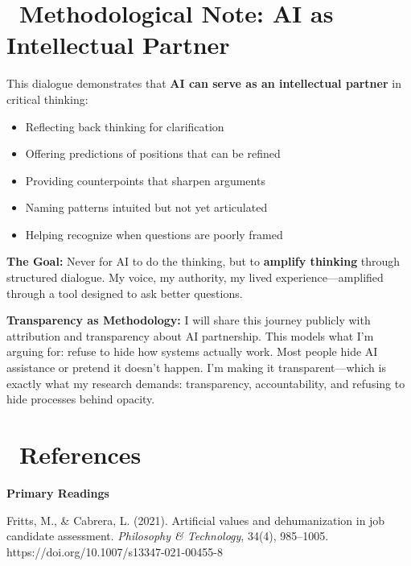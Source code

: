\documentclass[12pt,letterpaper]{article}
\begin{document}
\newpage
\section*{\color{primaryblue}\faUsers\ Methodological Note: AI as Intellectual Partner}

This dialogue demonstrates that \textbf{AI can serve as an intellectual partner} in critical thinking:

\begin{itemize}[leftmargin=*,noitemsep]
    \item Reflecting back thinking for clarification
    \item Offering predictions of positions that can be refined
    \item Providing counterpoints that sharpen arguments
    \item Naming patterns intuited but not yet articulated
    \item Helping recognize when questions are poorly framed
\end{itemize}

\textbf{The Goal:} Never for AI to do the thinking, but to \textbf{amplify thinking} through structured dialogue. My voice, my authority, my lived experience—amplified through a tool designed to ask better questions.

\begin{criticalinsight}
\textbf{Transparency as Methodology:} I will share this journey publicly with attribution and transparency about AI partnership. This models what I'm arguing for: refuse to hide how systems actually work. Most people hide AI assistance or pretend it doesn't happen. I'm making it transparent—which is exactly what my research demands: transparency, accountability, and refusing to hide processes behind opacity.
\end{criticalinsight}

\newpage
\section*{\faBook\ References}

\textbf{Primary Readings}

Fritts, M., \& Cabrera, L. (2021). Artificial values and dehumanization in job candidate assessment. \textit{Philosophy \& Technology}, 34(4), 985–1005. https://doi.org/10.1007/s13347-021-00455-8
\end{document}
